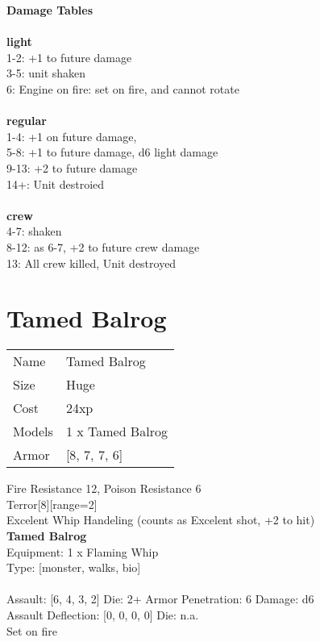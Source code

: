 {\bf Damage Tables} \\
\ \\ {\bf light } \\
1-2: +1 to future damage \\
3-5: unit shaken \\
6: Engine on fire: set on fire, and cannot rotate \\
\ \\ {\bf regular } \\
1-4: +1 on future damage, \\
5-8: +1 to future damage, d6 light damage \\
9-13: +2 to future damage \\
14+: Unit destroied \\
\ \\ {\bf crew } \\
4-7: shaken \\
8-12: as 6-7, +2 to future crew damage \\
13: All crew killed, Unit destroyed \\










\pagebreak\pagebreak

\section{ Tamed Balrog }

\begin{tabular}{ll}
  Name & Tamed Balrog \\
  Size & Huge\\
  Cost & 24xp\\
  Models & 1 x Tamed Balrog\\
  Armor & [8, 7, 7, 6]\\
\end{tabular}

\noindent Fire Resistance 12, Poison Resistance 6\\ 
Terror[8][range=2]\\ 
Excelent Whip Handeling (counts as Excelent shot, +2 to hit)\\ 


{\bf Tamed Balrog } \\
Equipment: 1 x Flaming Whip \\
Type: [monster, walks, bio] \\
\ \\
Assault: [6, 4, 3, 2] Die: 2+ Armor Penetration: 6 Damage: d6 \\
Assault Deflection: [0, 0, 0, 0] Die: n.a.\\
\indent Set on fire\\ 
 
